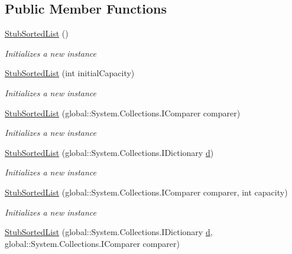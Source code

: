 \subsection*{Public Member Functions}
\begin{DoxyCompactItemize}
\item 
\hyperlink{class_system_1_1_collections_1_1_fakes_1_1_stub_sorted_list_adee25fc409cd849971042c90c1b9f1c1}{Stub\-Sorted\-List} ()
\begin{DoxyCompactList}\small\item\em Initializes a new instance\end{DoxyCompactList}\item 
\hyperlink{class_system_1_1_collections_1_1_fakes_1_1_stub_sorted_list_a7de9734d3452d8527068b2e77ee3b539}{Stub\-Sorted\-List} (int initial\-Capacity)
\begin{DoxyCompactList}\small\item\em Initializes a new instance\end{DoxyCompactList}\item 
\hyperlink{class_system_1_1_collections_1_1_fakes_1_1_stub_sorted_list_aa03e313fda8d1b6e6abe7b8e143155a5}{Stub\-Sorted\-List} (global\-::\-System.\-Collections.\-I\-Comparer comparer)
\begin{DoxyCompactList}\small\item\em Initializes a new instance\end{DoxyCompactList}\item 
\hyperlink{class_system_1_1_collections_1_1_fakes_1_1_stub_sorted_list_a20e6e8adb4f7c37952ee409e187130ac}{Stub\-Sorted\-List} (global\-::\-System.\-Collections.\-I\-Dictionary \hyperlink{bootstrap_8min_8js_aeb337d295abaddb5ec3cb34cc2e2bbc9}{d})
\begin{DoxyCompactList}\small\item\em Initializes a new instance\end{DoxyCompactList}\item 
\hyperlink{class_system_1_1_collections_1_1_fakes_1_1_stub_sorted_list_a175828cf284da7c3b31b745d6acaa5b8}{Stub\-Sorted\-List} (global\-::\-System.\-Collections.\-I\-Comparer comparer, int capacity)
\begin{DoxyCompactList}\small\item\em Initializes a new instance\end{DoxyCompactList}\item 
\hyperlink{class_system_1_1_collections_1_1_fakes_1_1_stub_sorted_list_a0dc42b8068b0c947ab5d1a9e96c73aed}{Stub\-Sorted\-List} (global\-::\-System.\-Collections.\-I\-Dictionary \hyperlink{bootstrap_8min_8js_aeb337d295abaddb5ec3cb34cc2e2bbc9}{d}, global\-::\-System.\-Collections.\-I\-Comparer comparer)

\end{DoxyCompactItemize}
